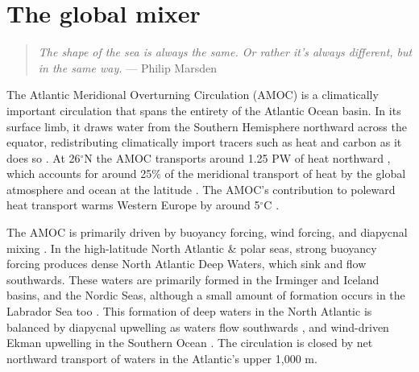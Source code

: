 \chapter{The global mixer}
\begin{quote}
\textit{The shape of the sea is always the same. Or rather it's always different, but in the same way.} --- Philip Marsden
\end{quote}

The Atlantic Meridional Overturning Circulation (AMOC) is a climatically important circulation that spans the entirety of the Atlantic Ocean basin. In its surface limb, it draws water from the Southern Hemisphere northward across the equator, redistributing climatically import tracers such as heat and carbon as it does so \citep{Buckley2015}. At 26$^\circ$N the AMOC transports around 1.25 PW of heat northward \citep{Bryden2020}, which accounts for around 25\% of the meridional transport of heat by the global atmosphere and ocean at the latitude \citep{Srokosz2012}. The AMOC's contribution to poleward heat transport warms Western Europe by around 5$^\circ$C \citep{Jackson2015}.

The AMOC is primarily driven by buoyancy forcing, wind forcing, and diapycnal mixing \citep[e.g.][]{Johnson2019, Munk1998}. In the high-latitude North Atlantic \& polar seas, strong buoyancy forcing produces dense North Atlantic Deep Waters, which sink and flow southwards. These waters are primarily formed in the Irminger and Iceland basins, and the Nordic Seas, although a small amount of formation occurs in the Labrador Sea too \citep{Lozier2019}. This formation of deep waters in the North Atlantic is balanced by diapycnal upwelling as waters flow southwards \citep{Cimoli2022,Ferrari2016,Mashayek2017,McDougall2017}, and wind-driven Ekman upwelling in the Southern Ocean \citep{Gnanadesikan1999, Marshall2012}. The circulation is closed by net northward transport of waters in the Atlantic's upper 1,000 m.

